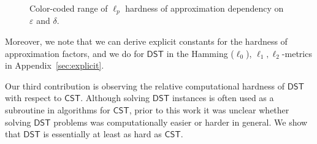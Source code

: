 \documentclass{article}\providecommand{\DeclareRedundantLanguages}[2]{}\usepackage[a4paper,margin=20mm]{geometry}
\newcommand{\1}{\textbf{1}}
\newcommand{\cst}{$\mathsf{CST}$\xspace}
\newcommand{\dst}{$\mathsf{DST}$\xspace}
\begin{document}
\begin{figure}[!h]







    \caption{Color-coded range of $\ell_p$ hardness of approximation dependency on $\varepsilon$ and $\delta$.}
    \label{fig: eps delta depend}
\end{figure}

Moreover, we note that we can derive explicit constants for the hardness of approximation factors, and we do for \dst in the Hamming ($\ell_0$), $\ell_1,\ell_2$-metrics in Appendix~\ref{sec:explicit}. 



Our third contribution is observing  the relative computational hardness of \dst with respect to  \cst. Although solving \dst instances is often used as a subroutine in algorithms for \cst, prior to this work it was unclear whether solving \dst problems was computationally easier or harder in general. We show that \dst is essentially at least as hard as \cst.
\end{document}
